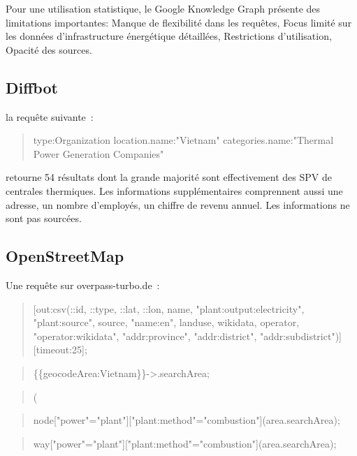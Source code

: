 \documentclass[a4paper,11pt]{report}
\begin{document}
Pour une utilisation statistique, le Google Knowledge Graph présente des limitations importantes: Manque de flexibilité dans les requêtes, Focus limité sur les données d'infrastructure énergétique détaillées, Restrictions d'utilisation, Opacité des sources.

\subsection{Diffbot}\label{diffbot}

la requête suivante~:

\begin{quote}
type:Organization location.name:"Vietnam" categories.name:"Thermal Power Generation Companies"
\end{quote}

retourne 54 résultats dont la grande majorité sont effectivement des SPV de centrales thermiques. Les informations supplémentaires comprennent aussi une adresse, un nombre d'employés, un chiffre de revenu annuel. Les informations ne sont pas sourcées.

\subsection{OpenStreetMap}\label{openstreetmap}

Une requête sur overpass-turbo.de~:

\begin{quote}
{[}out:csv(::id, ::type, ::lat, ::lon, name, "plant:output:electricity", "plant:source", source, "name:en", landuse, wikidata, operator, "operator:wikidata", "addr:province", "addr:district", "addr:subdistrict"){]}{[}timeout:25{]};
\end{quote}

\begin{quote}
\{\{geocodeArea:Vietnam\}\}-\textgreater.searchArea;
\end{quote}

\begin{quote}
(
\end{quote}

\begin{quote}
node{[}"power"="plant"{]}{[}"plant:method"="combustion"{]}(area.searchArea);
\end{quote}

\begin{quote}
way{[}"power"="plant"{]}{[}"plant:method"="combustion"{]}(area.searchArea);
\end{quote}
\end{document}
